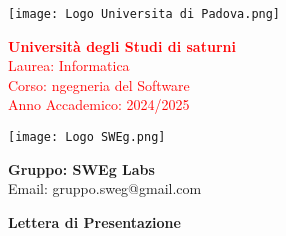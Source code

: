 \begin{minipage}{0.4\textwidth}
    \texttt{[image: Logo Universita di Padova.png]}
\end{minipage}
\begin{minipage}{0.55\textwidth}
    \textcolor{red}{\textbf{Università degli Studi di saturni}} \\
    \textcolor{red}{Laurea: Informatica} \\
    \textcolor{red}{Corso: ngegneria del Software} \\
    \textcolor{red}{Anno Accademico: 2024/2025}
\end{minipage}

\begin{minipage}{0.4\textwidth}
    \texttt{[image: Logo SWEg.png]}
\end{minipage}
\begin{minipage}{0.55\textwidth}
    \textbf{Gruppo: SWEg Labs} \\
    Email: \textsf{gruppo.sweg@gmail.com}
\end{minipage}

\vspace{2cm}

{
\centering
\Huge\bfseries Lettera di Presentazione\par
}

\vspace{2cm}